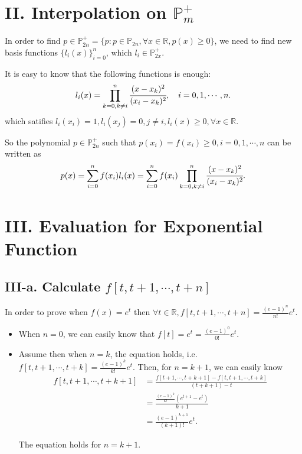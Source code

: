 \documentclass[a4paper]{article}
\begin{document}
\section*{II. Interpolation on $\mathbb{P}_{m}^+$}

In order to find $p \in \mathbb{P}_{2n}^+ = \{p: p\in \mathbb{P}_{2n}, \forall x\in\mathbb{R}, p(x)\ge 0\}$, we need to find new basis functions $\{l_i(x)\}_{i=0}^{n}$, which $l_i \in \mathbb{P}_{2x}^+$. 

It is easy to know that the following functions is enough:
\begin{equation}
  l_i(x) = \prod_{k=0, k\neq i}^{n} \cfrac{(x-x_k)^2}{(x_i-x_k)^2}, \quad i=0,1,\cdots,n.
\end{equation}
which satifies $l_i(x_i) = 1, l_i(x_j) = 0, j\neq i, l_i(x) \ge 0, \forall x\in\mathbb{R}$.

So the polynomial $p \in \mathbb{P}_{2n}^+$ such that $p(x_i) = f(x_i) \ge 0, i=0,1,\cdots,n$ can be written as
\begin{equation}
  p(x) = \sum_{i=0}^{n} f(x_i) l_i(x) = \sum_{i=0}^{n} f(x_i) \prod_{k=0, k\neq i}^{n} \cfrac{(x-x_k)^2}{(x_i-x_k)^2}.
\end{equation}
\section*{III. Evaluation for Exponential Function}

\subsection*{III-a. Calculate $f[t,t+1,\cdots, t+n]$}

In order to prove when $f(x) = e^t$ then $\forall t\in \mathbb{R}, f[t,t+1,\cdots, t+n] = \frac{(e-1)^n}{n!}e^t$.

\begin{itemize}
  \item When $n=0$, we can easily know that $f[t] = e^t = \frac{(e-1)^0}{0!}e^t$. 
  \item Assume then when $n=k$, the equation holds, i.e. $f[t,t+1,\cdots, t+k] = \frac{(e-1)^k}{k!}e^t$. 
  Then, for $n=k+1$, we can easily know
  \begin{equation}
    \begin{aligned}
      f[t,t+1,\cdots, t+k+1] &= \frac{f[t+1,\cdots, t+k+1] - f[t,t+1,\cdots, t+k]}{(t+k+1) - t} \\
                             &= \frac{\frac{(e-1)^k}{k!} (e^{t+1} - e^t)}{k+1} \\
                             &= \frac{(e-1)^{k+1}}{(k+1)!}e^t. 
    \end{aligned}
    \label{eq::III-a.1}
  \end{equation}

  The equation holds for $n=k+1$.
\end{itemize}
\end{document}
